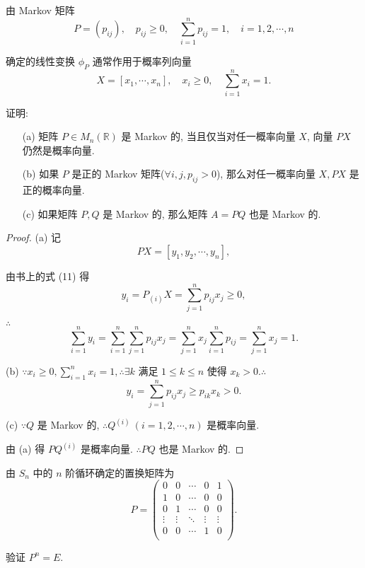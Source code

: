 \documentclass{ctexart}
\begin{document}
\begin{exercise}%
    由 Markov 矩阵
    \[P=(p_{ij}),\quad p_{ij}\geq0,\quad\sum\limits_{i=1}^np_{ij}=1,\quad i=1,2,\cdots,n\]
    
    确定的线性变换 $\phi_P$ 通常作用于概率列向量
    \[X=[x_1,\cdots,x_n],\quad x_i\geq0,\quad\sum\limits_{i=1}^nx_i=1.\]
    
    证明:
    \begin{itemize}
        \item[(a)] 矩阵 $P\in M_n(\mathbb{R})$ 是 Markov 的, 当且仅当对任一概率向量 $X$, 向量 $PX$ 仍然是概率向量.
        \item[(b)] 如果 $P$ 是正的 Markov 矩阵($\forall i,j,p_{ij}>0$), 那么对任一概率向量 $X,PX$ 是正的概率向量.
        \item[(c)] 如果矩阵 $P,Q$ 是 Markov 的, 那么矩阵 $A=PQ$ 也是 Markov 的.
    \end{itemize}
\end{exercise}
\begin{proof}
    (a) 记
    \[PX=[y_1,y_2,\cdots,y_n],\]

    由书上的式 (11) 得
    \[y_i=P_{(i)}X=\sum\limits_{j=1}^np_{ij}x_{j}\geq0,\]

    $\therefore$
    \[\sum\limits_{i=1}^ny_i=\sum\limits_{i=1}^n\sum\limits_{j=1}^np_{ij}x_{j}=\sum\limits_{j=1}^nx_{j}\sum\limits_{i=1}^np_{ij}=\sum\limits_{j=1}^nx_{j}=1.\]

    (b) $\because x_i\geq0,\sum\limits_{i=1}^nx_i=1,\therefore\exists k$ 满足 $1\leq k\leq n$ 使得 $x_k>0.\therefore$
    \[y_i=\sum\limits_{j=1}^np_{ij}x_{j}\geq p_{ik}x_k>0.\]

    (c) $\because Q$ 是 Markov 的, $\therefore Q^{(i)}\ (i=1,2,\cdots,n)$ 是概率向量.

    由 (a) 得 $PQ^{(i)}$ 是概率向量. $\therefore PQ$ 也是 Markov 的.
\end{proof}
\begin{exercise}%
    由 $S_n$ 中的 $n$ 阶循环确定的置换矩阵为
    \[P=\begin{pmatrix}
        0 & 0 & \cdots & 0 & 1 \\
        1 & 0 & \cdots & 0 & 0 \\
        0 & 1 & \cdots & 0 & 0 \\
        \vdots & \vdots & \ddots & \vdots & \vdots \\
        0 & 0 & \cdots & 1 & 0 \\
    \end{pmatrix}.\]

    验证 $P^n=E$.
\end{exercise}
\end{document}
